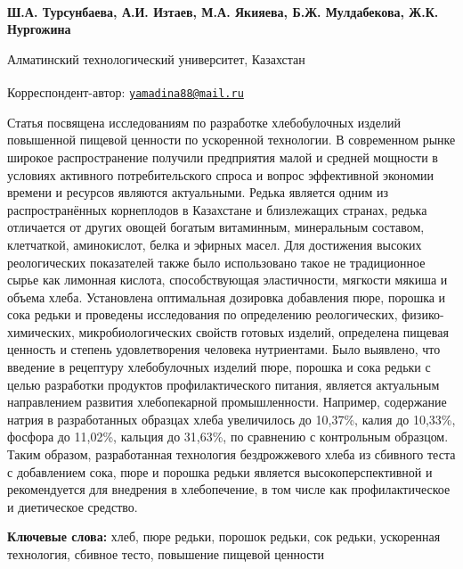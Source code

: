 
\begin{articleheader}

{\bfseries
Ш.А. Турсунбаева,
А.И. Изтаев,
М.А. Якияева\textsuperscript{\envelope },
Б.Ж. Мулдабекова,
Ж.К. Нургожина
}
\end{articleheader}

\begin{affiliation}
Алматинский технологический университет, Казахстан

\raggedright \textsuperscript{\envelope }Корреспондент-автор:
\href{mailto:yamadina88@mail.ru}{\nolinkurl{yamadina88@mail.ru}}
\end{affiliation}

Статья посвящена исследованиям по разработке хлебобулочных изделий
повышенной пищевой ценности по ускоренной технологии. В современном
рынке широкое распространение получили предприятия малой и средней
мощности в условиях активного потребительского спроса и вопрос
эффективной экономии времени и ресурсов являются актуальными. Редька
является одним из распространённых корнеплодов в Казахстане и
близлежащих странах, редька отличается от других овощей богатым
витаминным, минеральным составом, клетчаткой, аминокислот, белка и
эфирных масел. Для достижения высоких реологических показателей также
было использовано такое не традиционное сырье как лимонная кислота,
способствующая эластичности, мягкости мякиша и объема хлеба. Установлена
оптимальная дозировка добавления пюре, порошка и сока редьки и проведены
исследования по определению реологических, физико-химических,
микробиологических свойств готовых изделий, определена пищевая ценность
и степень удовлетворения человека нутриентами. Было выявлено, что
введение в рецептуру хлебобулочных изделий пюре, порошка и сока редьки с
целью разработки продуктов профилактического питания, является
актуальным направлением развития хлебопекарной промышленности. Например,
содержание натрия в разработанных образцах хлеба увеличилось до 10,37\%,
калия до 10,33\%, фосфора до 11,02\%, кальция до 31,63\%, по сравнению с
контрольным образцом. Таким образом, разработанная технология
бездрожжевого хлеба из сбивного теста с добавлением сока, пюре и порошка
редьки является высокоперспективной и рекомендуется для внедрения в
хлебопечение, в том числе как профилактическое и диетическое средство.

{\bfseries Ключевые слова:} хлеб, пюре редьки, порошок редьки, сок редьки,
ускоренная технология, сбивное тесто, повышение пищевой ценности

